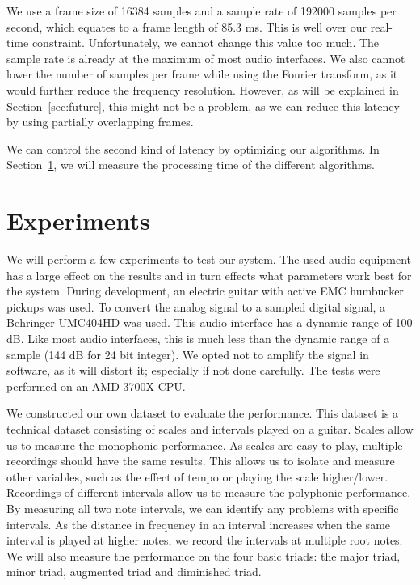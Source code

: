 \documentclass[10pt,twocolumn]{article}
\begin{document}
We use a frame size of 16384 samples and a sample rate of 192000 samples per second, which equates to a frame length of 85.3 ms. This is well over our real-time constraint. Unfortunately, we cannot change this value too much. The sample rate is already at the maximum of most audio interfaces. We also cannot lower the number of samples per frame while using the Fourier transform, as it would further reduce the frequency resolution. However, as will be explained in Section~\ref{sec:future}, this might not be a problem, as we can reduce this latency by using partially overlapping frames.

We can control the second kind of latency by optimizing our algorithms. In Section~\ref{sec:exp}, we will measure the processing time of the different algorithms.


\section{Experiments}  \label{sec:exp}
We will perform a few experiments to test our system. The used audio equipment has a large effect on the results and in turn effects what parameters work best for the system. During development, an electric guitar with active EMC humbucker pickups was used. To convert the analog signal to a sampled digital signal, a Behringer UMC404HD was used. This audio interface has a dynamic range of 100 dB. Like most audio interfaces, this is much less than the dynamic range of a sample (144 dB for 24 bit integer). We opted not to amplify the signal in software, as it will distort it; especially if not done carefully. The tests were performed on an AMD 3700X CPU.
%

We constructed our own dataset to evaluate the performance. This dataset is a technical dataset consisting of scales and intervals played on a guitar. Scales allow us to measure the monophonic performance. As scales are easy to play, multiple recordings should have the same results. This allows us to isolate and measure other variables, such as the effect of tempo or playing the scale higher/lower. Recordings of different intervals allow us to measure the polyphonic performance. By measuring all two note intervals, we can identify any problems with specific intervals. As the distance in frequency in an interval increases when the same interval is played at higher notes, we record the intervals at multiple root notes. We will also measure the performance on the four basic triads: the major triad, minor triad, augmented triad and diminished triad.
\end{document}
